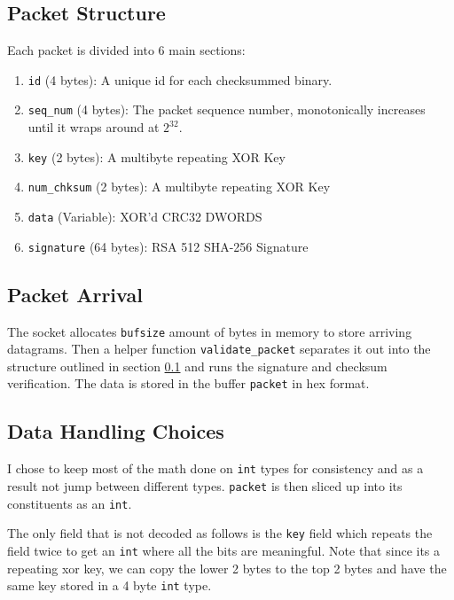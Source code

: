 \documentclass[acmtog,review]{acmart}
\begin{document}
\subsection{Packet Structure}
\label{packetstruct}

Each packet is divided into 6 main sections:

\begin{enumerate}
    \item \texttt{id} (4 bytes): A unique id for each checksummed binary.
    \item \texttt{seq\_num} (4 bytes): The packet sequence number, monotonically increases 
    until it wraps around at $2^{32}$.
    \item \texttt{key} (2 bytes): A multibyte repeating XOR Key
    \item \texttt{num\_chksum} (2 bytes): A multibyte repeating XOR Key
    \item \texttt{data} (Variable): XOR'd CRC32 DWORDS
    \item \texttt{signature} (64 bytes): RSA 512 SHA-256 Signature
\end{enumerate}

\subsection{Packet Arrival}

The socket allocates \texttt{bufsize} amount of bytes in memory to store arriving 
datagrams. Then a helper function \texttt{validate\_packet} separates it out into
the structure outlined in section \ref{packetstruct} and runs the signature
and checksum verification. The data is stored in the buffer \texttt{packet}
in hex format.

\subsection{Data Handling Choices}

I chose to keep most of the math done on \texttt{int} types for consistency
and as a result not jump between different types. \texttt{packet} is then
sliced up into its constituents as an \texttt{int}.

The only field that is not decoded as follows is the \texttt{key}
field which repeats the field twice to get an \texttt{int} where
all the bits are meaningful. Note that since its a repeating xor
key, we can copy the lower 2 bytes to the top 2 bytes and have
the same key stored in a 4 byte \texttt{int} type.
\end{document}

